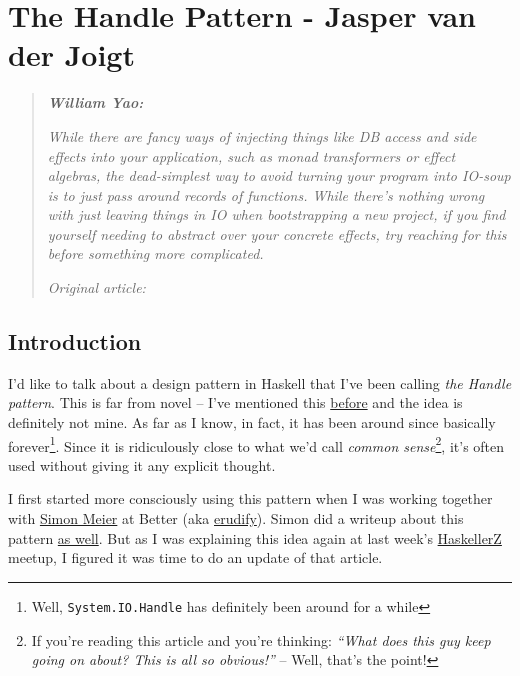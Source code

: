 \chapter{The Handle Pattern - Jasper van der Joigt}

\begin{quotation}
\noindent\textit{\textbf{William Yao:}}

\textit{While there are fancy ways of injecting things like DB access and side effects into your application, such as monad transformers or effect algebras, the dead-simplest way to avoid turning your program into IO-soup is to just pass around records of functions. While there's nothing wrong with just leaving things in IO when bootstrapping a new project, if you find yourself needing to abstract over your concrete effects, try reaching for this before something more complicated.}

\vspace{\baselineskip}
\noindent\textit{Original article: \cite{the_handle_pattern}}
\end{quotation}

\section{Introduction}

I'd like to talk about a design pattern in Haskell that I've been
calling \emph{the Handle pattern}. This is far from novel -- I've
mentioned this
\href{https://skillsmatter.com/skillscasts/10832-how-to-architect-medium-to-large-scale-haskell-applications}{before}
and the idea is definitely not mine. As far as I know, in fact, it has
been around since basically
forever\footnote{Well, \texttt{System.IO.Handle} has definitely been around for a while}.
Since it is ridiculously close to what we'd call \emph{common
sense}\footnote{If you're reading this article and you're thinking: \emph{``What does
  this guy keep going on about? This is all so obvious!''} -- Well,
  that's the
  point!},
it's often used without giving it any explicit thought.

I first started more consciously using this pattern when I was working
together with \href{https://github.com/meiersi}{Simon Meier} at Better
(aka
\href{https://jaspervdj.be/posts/2013-09-29-erudify.html}{erudify}).
Simon did a writeup about this pattern
\href{https://www.schoolofhaskell.com/user/meiersi/the-service-pattern}{as
well}. But as I was explaining this idea again at last week's
\href{https://www.meetup.com/HaskellerZ/}{HaskellerZ} meetup, I figured
it was time to do an update of that article.

